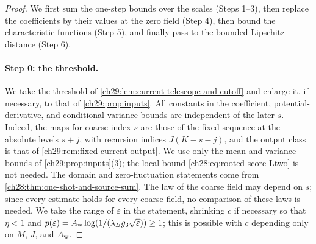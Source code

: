 \begin{proof}
We first sum the one-step bounds over the scales (Steps 1--3), then replace the coefficients by their values at the zero field (Step 4), then bound the characteristic functions (Step 5), and finally pass to the bounded-Lipschitz distance (Step 6).

\paragraph{Step 0: the threshold.}
We take the threshold of \cref{ch29:lem:current-telescope-and-cutoff} and enlarge it, if necessary, to that of \cref{ch29:prop:inputs}. All constants in the coefficient, potential-derivative, and conditional variance bounds are independent of the later $s$. Indeed, the maps for coarse index $s$ are those of the fixed sequence at the absolute levels $s+j$, with recursion indices $J(K-s-j)$, and the output class is that of \cref{ch29:rem:fixed-current-output}. We use only the mean and variance bounds of \cref{ch29:prop:inputs}(3); the local bound \eqref{ch28:eq:rooted-score-Ltwo} is not needed. The domain and zero-fluctuation statements come from \cref{ch28:thm:one-shot-and-source-sum}. The law of the coarse field may depend on $s$; since every estimate holds for every coarse field, no comparison of these laws is needed. We take the range of $\varepsilon$ in the statement, shrinking $c$ if necessary so that $\eta<1$ and $p(\varepsilon)=A_{\rm w}\log(1/(\lambda_Bg_3\sqrt\varepsilon))\ge1$; this is possible with $c$ depending only on $M$, $J$, and $A_{\rm w}$.


\end{proof}
